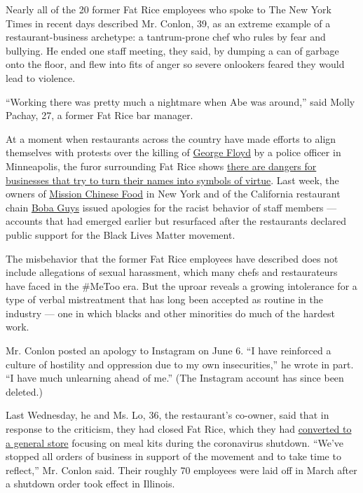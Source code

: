 Nearly all of the 20 former Fat Rice employees who spoke to The New York
Times in recent days described Mr. Conlon, 39, as an extreme example of
a restaurant-business archetype: a tantrum-prone chef who rules by fear
and bullying. He ended one staff meeting, they said, by dumping a can of
garbage onto the floor, and flew into fits of anger so severe onlookers
feared they would lead to violence.

``Working there was pretty much a nightmare when Abe was around,'' said
Molly Pachay, 27, a former Fat Rice bar manager.

At a moment when restaurants across the country have made efforts to
align themselves with protests over the killing of
\href{https://www.nytimes3xbfgragh.onion/article/george-floyd-who-is.html}{George
Floyd} by a police officer in Minneapolis, the furor surrounding Fat
Rice shows
\href{https://www.nytimes3xbfgragh.onion/2020/06/11/dining/food-brands-black-lives-matter-social-media.html}{there
are dangers for businesses that try to turn their names into symbols of
virtue}. Last week, the owners of
\href{https://ny.eater.com/2020/6/8/21284326/mission-chinese-race-danny-bowien}{Mission
Chinese Food} in New York and of the California restaurant chain
\href{https://www.sfgate.com/food/article/Boba-Guys-fires-manager-for-racist-comments-15330946.php}{Boba
Guys} issued apologies for the racist behavior of staff members ---
accounts that had emerged earlier but resurfaced after the restaurants
declared public support for the Black Lives Matter movement.

The misbehavior that the former Fat Rice employees have described does
not include allegations of sexual harassment, which many chefs and
restaurateurs have faced in the \#MeToo era. But the uproar reveals a
growing intolerance for a type of verbal mistreatment that has long been
accepted as routine in the industry --- one in which blacks and other
minorities do much of the hardest work.

Mr. Conlon posted an apology to Instagram on June 6. ``I have reinforced
a culture of hostility and oppression due to my own insecurities,'' he
wrote in part. ``I have much unlearning ahead of me.'' (The Instagram
account has since been deleted.)

Last Wednesday, he and Ms. Lo, 36, the restaurant's co-owner, said that
in response to the criticism, they had closed Fat Rice, which they had
\href{https://www.nytimes3xbfgragh.onion/2020/04/28/dining/super-fat-rice-mart-chicago-coronavirus.html}{converted
to a general store} focusing on meal kits during the coronavirus
shutdown. ``We've stopped all orders of business in support of the
movement and to take time to reflect,'' Mr. Conlon said. Their roughly
70 employees were laid off in March after a shutdown order took effect
in Illinois.

